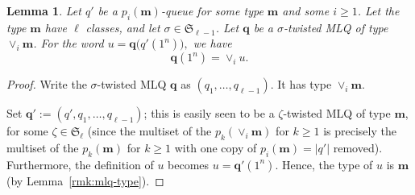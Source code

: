 \documentclass[reqno]{amsart}
\newcommand{\0}{\phantom{c}}
\newcommand{\merge}[1]{\vee_{#1}} %
\newcommand{\SymGp}[1]{\mathfrak{S}_{#1}} %
\newcommand{\mm}{\mathbf{m}}
\newcommand{\qq}{\mathbf{q}}
\newcommand{\set}[1]{\left\{ #1 \right\}}
\newcommand{\abs}[1]{\left| #1 \right|}
\newcommand{\tup}[1]{\left( #1 \right)}
\theoremstyle{plain}
\newtheorem{lemma}[thm]{Lemma}
\theoremstyle{definition}
\numberwithin{equation}{section}
\begin{document}
\begin{lemma}
\label{lemma:queue_merge}
  Let $q'$ be a $p_i(\mm)$-queue for some type $\mm$ and some $i \geq 1$.
  Let the type $\mm$ have $\ell$ classes, and let $\sigma \in \SymGp{\ell-1}$.
  Let $\qq$ be a $\sigma$-twisted MLQ of type $\merge{i}\mm$.
  For the word
  $
  u = \qq\bigl( q'(1^n) \bigr),
  $
  we have
  \[
  \qq(1^n) = \merge{i} u.
  \]
\end{lemma}

\begin{proof}
\begin{comment}
Let us first show an auxiliary observation.
Let $q$, $u$ and $t$ be as in Remark~\ref{rmk:t-splitting},
and let $h \in \set{1, 2, \ldots}$.
The permutation $\tup{i_1, i_2, \ldots, i_n}$ in the construction of $q(u)$
also works for the construction of $q(\merge{h} u)$,
since $(\merge{h} u)_a \leq (\merge{h} u)_b$ whenever $u_a \leq u_b$.
Thus, the construction of $q(\merge{h} u)$ proceeds exactly as the
construction of $q(u)$, except that the letters used to build
the former word are those of $\merge{h} u$ instead of those of $u$.
This yields an expression for each letter $(q(\merge{h} u))_i$ of
$q(\merge{h} u)$ depending on whether ...
\begin{equation}
 q(\merge{h} u) = \begin{cases}
                   \merge{h} q(u) , & \text{ if } h < t ; \\
                   \merge{h+1} q(u) , & \text{ if } h \geq t
                  \end{cases} .
\label{pf.lemma:queue_merge.1}
\end{equation}
\end{comment}
Write the $\sigma$-twisted MLQ $\qq$ as $\tup{q_1, \ldots, q_{\ell-1}}$.
It has type $\merge{i} \mm$.

Set $\qq' := \tup{q', q_1, \ldots, q_{\ell-1}}$; this is easily
seen to be a $\zeta$-twisted MLQ of type $\mm$, for some
$\zeta \in \SymGp{\ell}$
(since the multiset of the $p_k(\merge{i}\mm)$ for $k \geq 1$
is precisely the multiset of the $p_k(\mm)$ for $k \geq 1$
with one copy of $p_i(\mm) = \abs{q'}$ removed).
Furthermore, the definition of $u$ becomes $u = \qq' (1^n)$.
Hence, the type of $u$ is $\mm$ (by Lemma~\ref{rmk:mlq-type}).


\end{proof}
\end{document}
